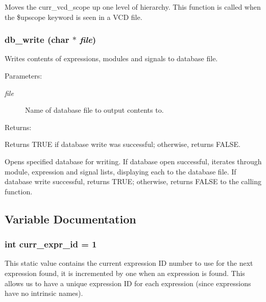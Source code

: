 Moves the curr\_\-vcd\_\-scope up one level of hierarchy. This function is called when the \$upscope keyword is seen in a VCD file. 
\subsubsection{ db\_\-write (char $\ast$ {\em file})}\label{db_8c_a14}


Writes contents of expressions, modules and signals to database file.

\begin{Desc}
\item[Parameters: ]\par
\begin{description}
\item[{\em 
file}]Name of database file to output contents to.\end{description}
\end{Desc}
\begin{Desc}
\item[Returns: ]\par
Returns TRUE if database write was successful; otherwise, returns FALSE.\end{Desc}
Opens specified database for writing. If database open successful, iterates through module, expression and signal lists, displaying each to the database file. If database write successful, returns TRUE; otherwise, returns FALSE to the calling function. 

\subsection{Variable Documentation}
\subsubsection{\setlength{\rightskip}{0pt plus 5cm}int curr\_\-expr\_\-id = 1}\label{db_8c_a12}


This static value contains the current expression ID number to use for the next expression found, it is incremented by one when an expression is found. This allows us to have a unique expression ID for each expression (since expressions have no intrinsic names). 
